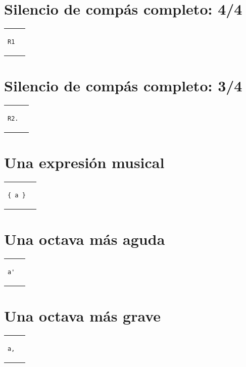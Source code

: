 \documentclass[10pt,a4paper,oneside,headinclude,titlepage]{scrartcl}
\begin{document}
\section*{Silencio de compás completo: 4/4}
\begin{tabular}{m{2cm}m{2cm}}
\begin{verbatim}
R1
\end{verbatim}
&
\begin[fragment]{lilypond}
R1
\end{lilypond}
\end{tabular}

\section*{Silencio de compás completo: 3/4}
\begin{tabular}{m{2cm}m{2cm}}
\begin{verbatim}
R2.
\end{verbatim}
&
\begin[fragment]{lilypond}
\time 3/4 R2.
\end{lilypond}
\end{tabular}

\section*{Una expresión musical}
\begin{tabular}{m{2cm}m{2cm}}
\begin{verbatim}
{ a }
\end{verbatim}
&
\begin[fragment]{lilypond}
{ a }
\end{lilypond}
\end{tabular}

\section*{Una octava más aguda}
\begin{tabular}{m{2cm}m{2cm}}
\begin{verbatim}
a'
\end{verbatim}
&
\begin[fragment]{lilypond}
a'
\end{lilypond}
\end{tabular}

\section*{Una octava más grave}
\begin{tabular}{m{2cm}m{2cm}}
\begin{verbatim}
a,
\end{verbatim}
&
\begin[fragment]{lilypond}
a,
\end{lilypond}
\end{tabular}
\end{document}
